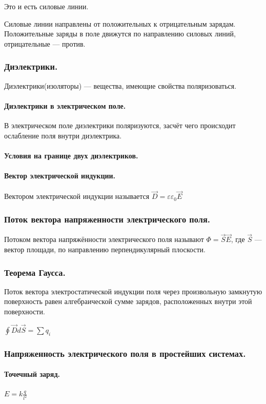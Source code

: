 \documentclass{article}
\begin{document}
                Это и есть силовые линии.

                Силовые линии направлены от положительных к отрицательным зарядам. Положительные заряды в поле движутся по направлению силовых линий, отрицательные --- против.
        \subsubsection{Диэлектрики.}
                Диэлектрики(изоляторы) --- вещества, имеющие свойства поляризоваться.
            \paragraph{Диэлектрики в электрическом поле.}
                В электрическом поле диэлектрики поляризуются, засчёт чего происходит ослабление поля внутри диэлектрика.
            \paragraph{Условия на границе двух диэлектриков.}
            \paragraph{Вектор электрической индукции.}
                Вектором электрической индукции называется \(\vec D = \varepsilon \varepsilon_0 \vec E\)
        \subsubsection{Поток вектора напряженности электрического поля.}
                Потоком вектора напряжённости электрического поля называют \(\Phi = \vec S \vec E\), где \(\vec S\) --- вектор площади, по направлению перпендикулярный плоскости.
        \subsubsection{Теорема Гаусса.}
                Поток вектора электростатической индукции поля через произвольную замкнутую поверхность равен алгебраической сумме зарядов, расположенных внутри этой поверхности.
                
                \(\oint{\vec D d\vec S} = \sum{q_i}\)
        \subsubsection{Напряженность электрического поля в простейших системах.}
            \paragraph{Точечный заряд.}
                \(E = k\frac{q}{l^2}\)
\end{document}
